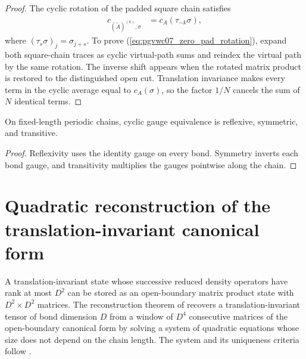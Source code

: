 \begin{proof}
    \leanok
    The cyclic rotation of the padded square chain satisfies
    \begin{align}
        c_{(\widetilde A)^{(k)},\sigma}
         & =c_A(\tau_{-k}\sigma),
        \label{eq:pgvwc07_zero_pad_rotation}
    \end{align}
    where $(\tau_s\sigma)_j=\sigma_{j+s}$. To prove
    (\ref{eq:pgvwc07_zero_pad_rotation}), expand both square-chain traces as
    cyclic virtual-path sums and reindex the virtual path by the same rotation.
    The inverse shift appears when the rotated matrix product is restored to
    the distinguished open cut. Translation invariance makes every term in
    the cyclic average equal to $c_A(\sigma)$, so the factor $1/N$ cancels the
    sum of $N$ identical terms.
\end{proof}

\begin{lemma}
    \label{lem:chain_gauge_equiv_equivalence}
    \leanok
    On fixed-length periodic chains, cyclic gauge equivalence is reflexive,
    symmetric, and transitive.
\end{lemma}

\begin{proof}
    \leanok
    Reflexivity uses the identity gauge on every bond.
    Symmetry inverts each bond gauge, and transitivity multiplies the gauges
    pointwise along the chain.
\end{proof}



\section{Quadratic reconstruction of the translation-invariant canonical form}%
\label{sec:quadratic_reconstruction}

A translation-invariant state whose successive reduced density operators have
rank at most $D^2$ can be stored as an open-boundary matrix product state with
$D^2\times D^2$ matrices. The reconstruction theorem of
\cite[Theorem~8]{PerezGarcia2007Matrix} recovers a translation-invariant
tensor of bond dimension $D$ from a window of $D^4$ consecutive matrices of
the open-boundary canonical form by solving a system of quadratic equations
whose size does not depend on the chain length. The system and its uniqueness
criteria follow \cite[Theorems~7 and~8]{PerezGarcia2007Matrix}.

